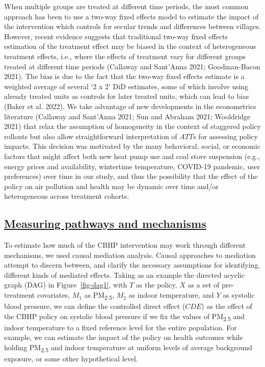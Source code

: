\documentclass[
  letterpaper,
  DIV=11,
  numbers=noendperiod]{scrartcl}
\providecommand{\DIFadd}[1]{{\protect\color{blue}\underline{#1}}} %
\providecommand{\DIFaddbegin}{} %
\providecommand{\DIFaddend}{} %
\providecommand{\DIFdelbegin}{} %
\providecommand{\DIFdelend}{} %
\newcommand{\DIFscaledelfig}{0.5}
\newlength{\DIFdelgraphicswidth} %
\newlength{\DIFdelgraphicsheight} %
\newcommand{\DIFaddincludegraphics}[2][]{{\color{blue}\fbox{\DIFOincludegraphics[#1]{#2}}}} %
\newcommand{\DIFdelincludegraphics}[2][]{%
\sbox{\DIFdelgraphicsbox}{\DIFOincludegraphics[#1]{#2}}%
\settoboxwidth{\DIFdelgraphicswidth}{\DIFdelgraphicsbox} %
\settoboxtotalheight{\DIFdelgraphicsheight}{\DIFdelgraphicsbox} %
\scalebox{\DIFscaledelfig}{%
\parbox[b]{\DIFdelgraphicswidth}{\usebox{\DIFdelgraphicsbox}\\[-\baselineskip] \rule{\DIFdelgraphicswidth}{0em}}\llap{\resizebox{\DIFdelgraphicswidth}{\DIFdelgraphicsheight}{%
\setlength{\unitlength}{\DIFdelgraphicswidth}%
\begin{picture}(1,1)%
\thicklines\linethickness{2pt} %
{\color[rgb]{1,0,0}\put(0,0){\framebox(1,1){}}}%
{\color[rgb]{1,0,0}\put(0,0){\line( 1,1){1}}}%
{\color[rgb]{1,0,0}\put(0,1){\line(1,-1){1}}}%
\end{picture}%
}\hspace*{3pt}}} %
} %
\DeclareRobustCommand{\DIFaddbegin}{\DIFOaddbegin \let\includegraphics\DIFaddincludegraphics} %
\DeclareRobustCommand{\DIFaddend}{\DIFOaddend \let\includegraphics\DIFOincludegraphics} %
\DeclareRobustCommand{\DIFdelbegin}{\DIFOdelbegin \let\includegraphics\DIFdelincludegraphics} %
\DeclareRobustCommand{\DIFdelend}{\DIFOaddend \let\includegraphics\DIFOincludegraphics} %
\begin{document}
When multiple groups are treated at different time periods, the most
common approach has been to use a two-way fixed effects model to
estimate the impact of the intervention which controls for secular
trends and differences between villages. However, recent evidence
suggests that traditional two-way fixed effects estimation of the
treatment effect may be biased in the context of heterogeneous treatment
effects, i.e., where the effects of treatment vary for different groups
treated at different time periods (Callaway and Sant'Anna 2021;
Goodman-Bacon 2021). The bias is due to the fact that the two-way fixed
effects estimate is a weighted average of several `2 x 2' DiD estimates,
some of which involve using already treated units as controls for later
treated units, which can lead to bias (Baker et al. 2022). We take
advantage of new developments in the econometrics literature (Callaway
and Sant'Anna 2021; Sun and Abraham 2021; Wooldridge 2021) that relax
the assumption of homogeneity in the context of staggered policy
rollouts but also allow straightforward interpretation of \(ATT\)s for
assessing policy impacts. This decision was motivated by the many
behavioral, social, or economic factors that might affect both new heat
pump use and coal stove suspension (e.g., energy prices and
availability, wintertime temperature, COVID-19 pandemic, user
preferences) over time in our study, and thus the possibility that the
effect of the policy on air pollution and health may be dynamic over
time and/or heterogeneous across treatment cohorts.

\DIFdelbegin %
\DIFdelend \DIFaddbegin \subsection{\DIFadd{Measuring pathways and
mechanisms}}\label{measuring-pathways-and-mechanisms}
\DIFaddend 

To estimate how much of the CBHP intervention may work through different
mechanisms, we used causal mediation analysis. Causal approaches to
mediation attempt to discern between, and clarify the necessary
assumptions for identifying, different kinds of mediated effects. Taking
as an example the directed acyclic graph (DAG) in Figure~\ref{fig-dag1},
with \(T\) as the policy, \(X\) as a set of pre-treatment covariates,
\(M_{1}\) as PM\textsubscript{2.5}, \(M_{2}\) as indoor temperature, and
\(Y\) as systolic blood pressure, we can define the controlled direct
effect (\(CDE\)) as the effect of the CBHP policy on systolic blood
pressure if we fix the values of PM\textsubscript{2.5} and indoor
temperature to a fixed reference level for the entire population. For
example, we can estimate the impact of the policy on health outcomes
while holding PM\textsubscript{2.5} and indoor temperature at uniform
levels of average background exposure, or some other hypothetical level.
\end{document}
